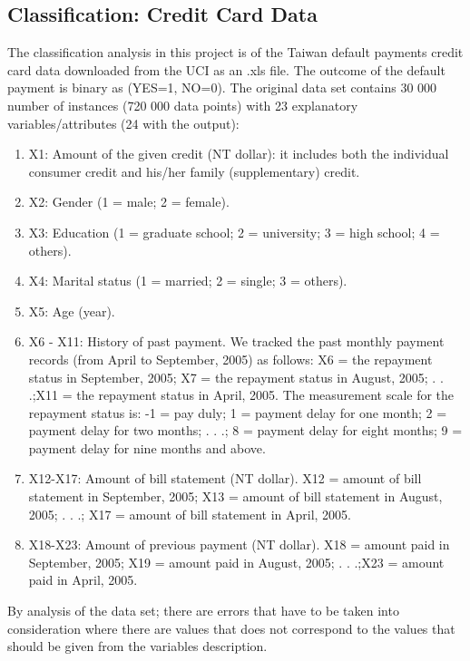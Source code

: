\documentclass[12pt,a4paper,english]{article}
\begin{document}
\subsection{Classification: Credit Card Data}
\label{subsect:credit_data}
The classification analysis in this project is of the Taiwan default payments credit card data downloaded from the UCI \cite{UCI} as an .xls file. The outcome of the default payment is binary as (YES=1, NO=0). The original data set contains 30 000 number of instances (720 000 data points) with 23 explanatory variables/attributes (24 with the output):
\begin{enumerate}
	\item X1: Amount of the given credit (NT dollar): it includes both the individual consumer credit and his/her family (supplementary) credit. 
	\item X2: Gender (1 = male; 2 = female). 
	\item X3: Education (1 = graduate school; 2 = university; 3 = high school; 4 = others). 
	\item X4: Marital status (1 = married; 2 = single; 3 = others). 
	\item X5: Age (year). 
	\item X6 - X11: History of past payment. We tracked the past monthly payment records (from April to September, 2005) as follows: X6 = the repayment status in September, 2005; X7 = the repayment status in August, 2005; . . .;X11 = the repayment status in April, 2005. The measurement scale for the repayment status is: -1 = pay duly; 1 = payment delay for one month; 2 = payment delay for two months; . . .; 8 = payment delay for eight months; 9 = payment delay for nine months and above. 
	\item X12-X17: Amount of bill statement (NT dollar). X12 = amount of bill statement in September, 2005; X13 = amount of bill statement in August, 2005; . . .; X17 = amount of bill statement in April, 2005. 
	\item X18-X23: Amount of previous payment (NT dollar). X18 = amount paid in September, 2005; X19 = amount paid in August, 2005; . . .;X23 = amount paid in April, 2005. 
\end{enumerate}
By analysis of the data set; there are errors that have to be taken into consideration where there are values that does not correspond to the values that should be given from the variables description.
\end{document}
